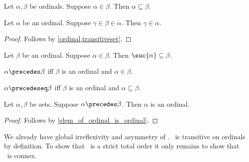 \begin{proposition}\label{ordinal_elem_implies_subseteq}
    Let $\alpha,\beta$ be ordinals.
    Suppose $\alpha\in\beta$.
    Then $\alpha\subseteq\beta$.
\end{proposition}

\begin{proposition}\label{ordinal_transitivity}
    Let $\alpha$ be an ordinal.
    Suppose $\gamma\in\beta\in\alpha$.
    Then $\gamma\in\alpha$.
\end{proposition}
\begin{proof}
    Follows by \cref{ordinal,transitiveset}.
\end{proof}

\begin{proposition}\label{ordinal_suc_subseteq}
    Let $\beta$ be an ordinal.
    Suppose $\alpha\in\beta$.
    Then $\suc{\alpha}\subseteq\beta$.
\end{proposition}


\begin{abbreviation}\label{ordinal_prec}
    $\alpha \precedes \beta$ iff
    $\beta$ is an ordinal and
    $\alpha\in\beta$.
\end{abbreviation}

\begin{abbreviation}\label{ordinal_preceq}
    $\alpha\precedeseq \beta$ iff $\beta$ is an ordinal and $\alpha\subseteq\beta$.
\end{abbreviation}

\begin{lemma}\label{prec_is_ordinal}
    Let $\alpha,\beta$ be sets.
    Suppose $\alpha\precedes \beta$.
    Then $\alpha$ is an ordinal.
\end{lemma}
\begin{proof}
    Follows by \cref{elem_of_ordinal_is_ordinal}.
\end{proof}

We already have global irreflexivity and asymmetry of \in.
\in\ is transitive on ordinals by definition.
To show that \in\ is a strict total order it only remains to show that \in\ is connex.

